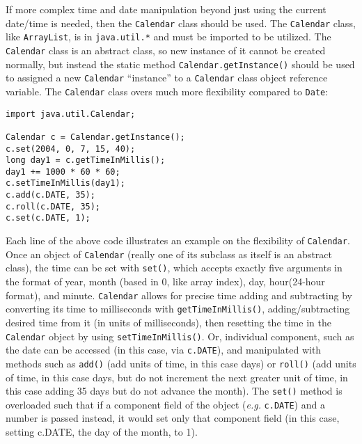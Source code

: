 \documentclass{tufte-handout}
\begin{document}
    If more complex time and date manipulation beyond just using the current date/time is needed, then the \texttt{Calendar} class should be used. The \texttt{Calendar} class, like \texttt{ArrayList}, is in \texttt{java.util.*} and must be imported to be utilized. The \texttt{Calendar} class is an abstract class, so new instance of it cannot be created normally, but instead the static method \texttt{Calendar.getInstance()} should be used to assigned a new \texttt{Calendar} ``instance'' to a \texttt{Calendar} class object reference variable. The \texttt{Calendar} class overs much more flexibility compared to \texttt{Date}:

    \begin{lstlisting}
import java.util.Calendar;

Calendar c = Calendar.getInstance();
c.set(2004, 0, 7, 15, 40);
long day1 = c.getTimeInMillis();
day1 += 1000 * 60 * 60;
c.setTimeInMillis(day1);
c.add(c.DATE, 35);
c.roll(c.DATE, 35);
c.set(c.DATE, 1);
    \end{lstlisting}

    Each line of the above code illustrates an example on the flexibility of \texttt{Calendar}. Once an object of \texttt{Calendar} (really one of its subclass as itself is an abstract class), the time can be set with \texttt{set()}, which accepts exactly five arguments in the format of year, month (based in 0, like array index), day, hour(24-hour format), and minute. \texttt{Calendar} allows for precise time adding and subtracting by converting its time to milliseconds with \texttt{getTimeInMillis()}, adding/subtracting desired time from it (in units of milliseconds), then resetting the time in the \texttt{Calendar} object by using \texttt{setTimeInMillis()}. Or, individual component, such as the date can be accessed (in this case, via \texttt{c.DATE}), and manipulated with methods such as \texttt{add()} (add units of time, in this case days) or \texttt{roll()} (add units of time, in this case days, but do not increment the next greater unit of time, in this case adding 35 days but do not advance the month). The \texttt{set()} method is overloaded such that if a component field of the object (\textit{e.g.} \texttt{c.DATE}) and a number is passed instead, it would set only that component field (in this case, setting c.DATE, the day of the month, to 1).
\end{document}

